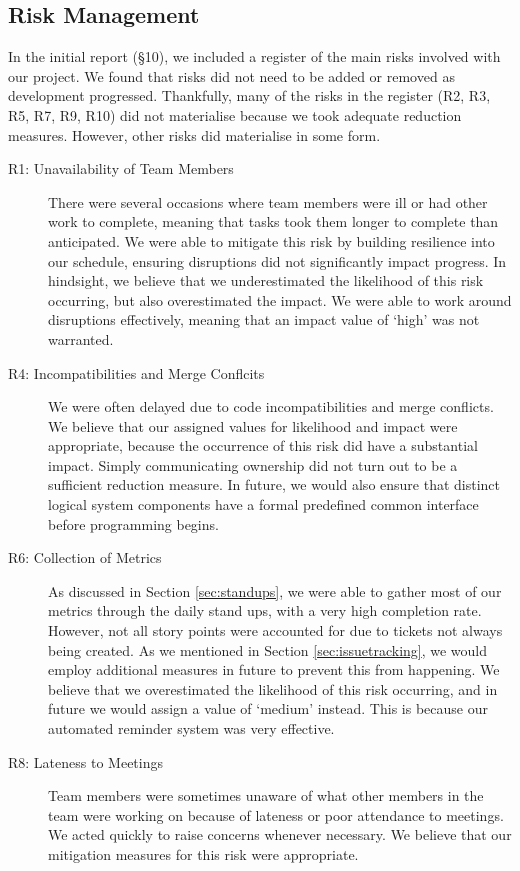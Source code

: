 \subsection{Risk Management}
In the initial report (§10), we included a register of the main risks involved with our project.  We found that risks did not need to be added or removed as development progressed. Thankfully, many of the risks in the register (R2, R3, R5, R7, R9, R10) did not materialise because we took adequate reduction measures. However, other risks did materialise in some form. 
\begin{description}
	\item[R1: Unavailability of Team Members] There were several occasions where team members were ill or had other work to complete, meaning that tasks took them longer to complete than anticipated. We were able to mitigate this risk by building resilience into our schedule, ensuring disruptions did not significantly impact progress. In hindsight, we believe that we underestimated the likelihood of this risk occurring, but also overestimated the impact. We were able to work around disruptions effectively, meaning that an impact value of `high’ was not warranted.
	\item[R4: Incompatibilities and Merge Conflcits] We were often delayed due to code incompatibilities and merge conflicts. We believe that our assigned values for likelihood and impact were appropriate, because the occurrence of this risk did have a substantial impact. Simply communicating ownership did not turn out to be a sufficient reduction measure. In future, we would also ensure that distinct logical system components have a formal predefined common interface before programming begins.
	\item[R6: Collection of Metrics] As discussed in Section \ref{sec:standups}, we were able to gather most of our metrics through the daily stand ups, with a very high completion rate. However, not all story points were accounted for due to tickets not always being created. As we mentioned in Section \ref{sec:issuetracking}, we would employ additional measures in future to prevent this from happening. We believe that we overestimated the likelihood of this risk occurring, and in future we would assign a value of `medium’ instead. This is because our automated reminder system was very effective.
	\item[R8: Lateness to Meetings] Team members were sometimes unaware of what other members in the team were working on because of lateness or poor attendance to meetings. We acted quickly to raise concerns whenever necessary. We believe that our mitigation measures for this risk were appropriate. 
\end{description}
